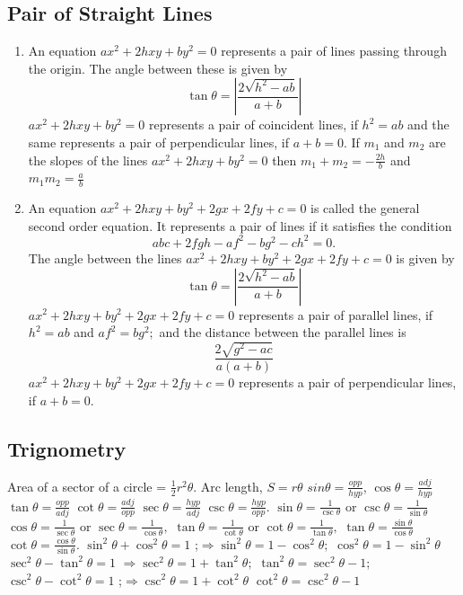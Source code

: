 \documentclass{article}
\begin{document}
\subsection*{Pair of Straight Lines}
\begin{enumerate}
\item An equation $ax^{2}+2hxy+by^{2}=0$ represents a pair of lines passing through the origin. The angle between these is given by
\[
\tan\theta=|\frac{2\sqrt{h^{2}-ab}}{a+b}|
\]
$ax^{2}+2hxy+by^{2}=0$ represents a pair of coincident lines, if $h^{2}=ab$ and the same represents a pair of perpendicular lines, if $a+b=0$.
If $m_{1}$ and $m_{2}$ are the slopes of the lines $ax^{2}+2hxy+by^{2}=0$ then $m_{1}+m_{2}=-\frac{2h}{b}$ and $m_{1}m_{2}=\frac{a}{b}$
\item An equation $ax^{2}+2hxy+by^{2}+2gx+2fy+c=0$ is called the general second order equation. It represents a pair of lines if it satisfies the condition
\[
abc+2fgh-af^{2}-bg^{2}-ch^{2}=0.
\]
The angle between the lines $ax^{2}+2hxy+by^{2}+2gx+2fy+c=0$ is given by
\[
\tan\theta=|\frac{2\sqrt{h^{2}-ab}}{a+b}|
\]
$ax^{2}+2hxy+by^{2}+2gx+2fy+c=0$ represents a pair of parallel lines, if $h^{2}=ab$ and $af^{2}=bg^{2};$ and the distance between the parallel lines is
\[
\frac{2\sqrt{g^{2}-ac}}{a(a+b)}
\]
$ax^{2}+2hxy+by^{2}+2gx+2fy+c=0$ represents a pair of perpendicular lines, if $a+b=0$.
\end{enumerate}

\subsection*{Trignometry}
Area of a sector of a circle = $\frac{1}{2}r^{2}\theta.$
Arc length, $S=r\theta$
$sin\theta=\frac{opp}{hyp}$, $\cos\theta=\frac{adj}{hyp}$ $\tan\theta=\frac{opp}{adj}$
$\cot\theta=\frac{adj}{opp}$ $\sec\theta=\frac{hyp}{adj}$ $\csc\theta=\frac{hyp}{opp}.$
$\sin\theta=\frac{1}{\csc\theta}$ or $\csc\theta=\frac{1}{\sin\theta}$
$\cos\theta=\frac{1}{\sec\theta}$ or $\sec\theta=\frac{1}{\cos\theta},$
$\tan\theta=\frac{1}{\cot\theta}$ or $\cot\theta=\frac{1}{\tan\theta},$
$\tan\theta=\frac{\sin\theta}{\cos\theta}$
$\cot\theta=\frac{\cos\theta}{\sin\theta}.$
$\sin^{2}\theta+\cos^{2}\theta=1$ ;$\Rightarrow \sin^{2}\theta=1-\cos^{2}\theta;$ $\cos^{2}\theta=1-\sin^{2}\theta$
$\sec^{2}\theta-\tan^{2}\theta=1$ $\Rightarrow \sec^{2}\theta=1+\tan^{2}\theta;$ $\tan^{2}\theta=\sec^{2}\theta-1$;
$\csc^{2}\theta-\cot^{2}\theta=1$ ;$\Rightarrow \csc^{2}\theta=1+\cot^{2}\theta$ $\cot^{2}\theta=\csc^{2}\theta-1$
\end{document}
